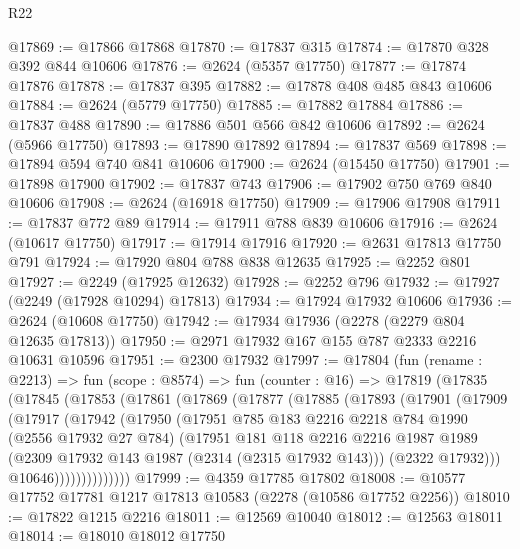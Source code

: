 \begin{lexlean}{R22}
\begin{coremodule}
@17869 := @17866 @17868
@17870 := @17837 @315
@17874 := @17870 @328 @392 @844 @10606
@17876 := @2624 (@5357 @17750)
@17877 := @17874 @17876
@17878 := @17837 @395
@17882 := @17878 @408 @485 @843 @10606
@17884 := @2624 (@5779 @17750)
@17885 := @17882 @17884
@17886 := @17837 @488
@17890 := @17886 @501 @566 @842 @10606
@17892 := @2624 (@5966 @17750)
@17893 := @17890 @17892
@17894 := @17837 @569
@17898 := @17894 @594 @740 @841 @10606
@17900 := @2624 (@15450 @17750)
@17901 := @17898 @17900
@17902 := @17837 @743
@17906 := @17902 @750 @769 @840 @10606
@17908 := @2624 (@16918 @17750)
@17909 := @17906 @17908
@17911 := @17837 @772 @89
@17914 := @17911 @788 @839 @10606
@17916 := @2624 (@10617 @17750)
@17917 := @17914 @17916
@17920 := @2631 @17813 @17750 @791
@17924 := @17920 @804 @788 @838 @12635
@17925 := @2252 @801
@17927 := @2249 (@17925 @12632)
@17928 := @2252 @796
@17932 := @17927 (@2249 (@17928 @10294) @17813)
@17934 := @17924 @17932 @10606
@17936 := @2624 (@10608 @17750)
@17942 := @17934 @17936 (@2278 (@2279 @804 @12635 @17813))
@17950 := @2971 @17932 @167 @155 @787 @2333 @2216 @10631 @10596
@17951 := @2300 @17932
@17997 := @17804
    (fun (rename : @2213) =>
    fun (scope : @8574) =>
    fun (counter : @16) =>
    @17819
      (@17835
        (@17845
          (@17853
            (@17861
              (@17869
                (@17877
                  (@17885
                    (@17893
                      (@17901
                        (@17909
                          (@17917
                            (@17942
                              (@17950
                                (@17951
                                  @785
                                  @183
                                  @2216
                                  @2218
                                  @784
                                  @1990
                                  (@2556 @17932 @27 @784)
                                  (@17951
                                    @181
                                    @118
                                    @2216
                                    @2216
                                    @1987
                                    @1989
                                    (@2309 @17932 @143 @1987 (@2314 (@2315 @17932 @143)))
                                    (@2322 @17932)))
                                @10646))))))))))))))
@17999 := @4359 @17785 @17802
@18008 := @10577 @17752 @17781 @1217 @17813 @10583 (@2278 (@10586 @17752 @2256))
@18010 := @17822 @1215 @2216
@18011 := @12569 @10040
@18012 := @12563 @18011
@18014 := @18010 @18012 @17750

\end{coremodule}
\end{lexlean}
